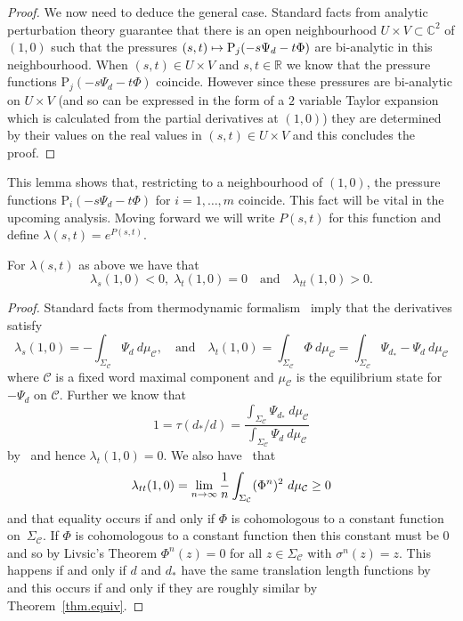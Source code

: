 \documentclass[AHL,Unicode,longabstracts,published]{cedram}
\renewcommand{\P}{\Psi}
\newcommand{\Cc}{\mathcal{C}}
\newcommand{\C}{\mathbb{C}}
\newcommand{\R}{\mathbb{R}}
\newcommand*\rmP{\mathrm{P}}
\renewcommand*{\to}{\mathchoice{\longrightarrow}{\rightarrow}{\rightarrow}{\rightarrow}}
\let\oldmapsto\mapsto
\renewcommand*{\mapsto}{\mathchoice{\longmapsto}{\oldmapsto}{\oldmapsto}{\oldmapsto}}
\newcounter{setofcase}
\newcounter{case}[setofcase]
\theoremstyle{plain}
\begin{document}
\begin{proof}
We now need to deduce the general case. Standard facts from analytic perturbation theory guarantee that there is an open neighbourhood $U \times V \subset \C^2$ of $(1,0)$ such that the pressures $(s,t) \mapsto \rmP_j(-s\Psi_d - t\Phi)$ are bi-analytic in this neighbourhood. When $(s,t) \in U \times V$ and $s,t\in \R$ we know that the pressure functions $\rmP_j(-s\Psi_d - t\Phi)$ coincide. However since these pressures are bi-analytic on $U \times V$ (and so can be expressed in the form of a $2$ variable Taylor expansion which is calculated from the partial derivatives at $(1,0)$) they are determined by their values on the real values in $(s,t) \in U \times V$ and this concludes the proof.
\end{proof}

This lemma shows that, restricting to a neighbourhood of $(1,0)$, the pressure functions $\rmP_i(-s\Psi_d - t\Phi)$ for $i=1,\dots, m$ coincide. This fact will be vital in the upcoming analysis. Moving forward we will write $P(s,t)$ for this function and define $\lambda(s,t) = e^{P(s,t)}$.

\begin{lemm}\label{lem.deriv}
For $\lambda(s,t)$ as above we have that
\[
\lambda_{s}(1,0) < 0, \; \lambda_{t}(1,0) = 0 \quad\text{and}\quad  \lambda_{t t}(1,0) > 0.
\]
\end{lemm}

\begin{proof}
Standard facts from thermodynamic formalism~\cite{ParryPollicott} imply that the derivatives satisfy
\[
\lambda_s(1,0) = -\int_{\Sigma_\Cc} \Psi_d \ d\mu_{\Cc}, \quad\text{and}\quad \lambda_t(1,0) = \int_{\Sigma_\Cc} \Phi \ d\mu_{\Cc} = \int_{\Sigma_\Cc} \Psi_{d_\ast} - \Psi_d \ d\mu_{\Cc}
\]
where $\Cc$ is a fixed word maximal component and $\mu_\Cc$ is the equilibrium state for $-\Psi_d$ on $\Cc$. Further we know that
\[
1 = \tau(d_\ast/d) = \frac{ \int_{\Sigma_\Cc} \P_{d_\ast} \ d\mu_\Cc}{\int_{\Sigma_\Cc} \P_{d} \ d\mu_\Cc}
\]
by~\cite[Theorem~5.4]{cantrell.tanaka.2} and hence $\lambda_t(1,0) = 0$. We also have~\cite{ParryPollicott} that
\[
\lambda_{t t}(1,0) = \lim_{n\to\infty} \frac{1}{n} \int_{\Sigma_\Cc} (\Phi^n)^2 \ d\mu_{\Cc} \ge 0
\]
and that equality occurs if and only if $\Phi$ is cohomologous to a constant function on~$\Sigma_\Cc$. If $\Phi$ is cohomologous to a constant function then this constant must be $0$ and so by Livsic's Theorem $\Phi^n(z) = 0$ for all $z \in \Sigma_\Cc$ with $\sigma^n(z) = z$. This happens if and only if $d$ and $d_\ast$ have the same translation length functions by~\cite[Corollary~3.6]{cantrell} and this occurs if and only if they are roughly similar by Theorem~\ref{thm.equiv}.
\end{proof}
\end{document}
